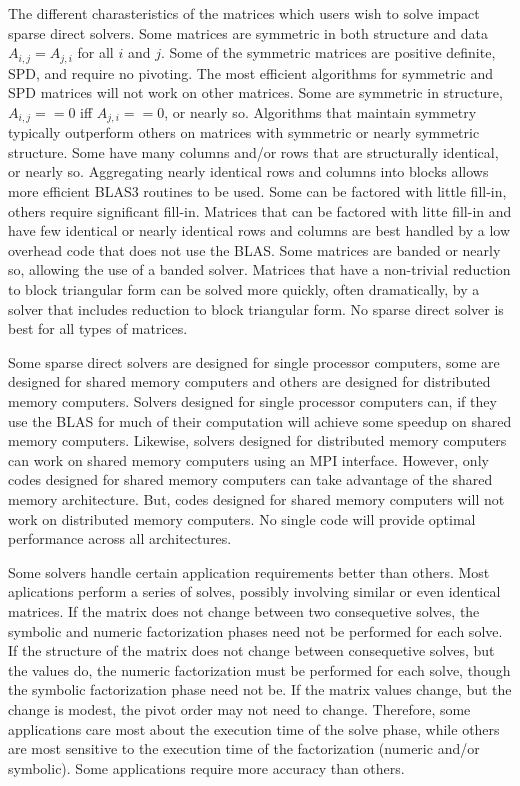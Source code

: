 \documentclass[acmtocl]{acmtrans2m}
\begin{document}
The different charasteristics of the matrices which users wish to
solve impact sparse direct solvers.  Some matrices are symmetric in both
structure and data $A_{i,j} = A_{j,i}$ for all $i$ and $j$.  Some of
the symmetric matrices are positive definite, SPD, and require no
pivoting.  The most efficient algorithms for symmetric and SPD
matrices will not work on other matrices.  Some are symmetric in
structure, $A_{i,j} == 0$ iff $A_{j,i} == 0$, or nearly so.
Algorithms that maintain symmetry typically outperform others on
matrices with symmetric or nearly symmetric structure.  Some have many
columns and/or rows that are structurally identical, or nearly so.
Aggregating nearly identical rows and columns into blocks allows more
efficient BLAS3 routines to be used.  Some can be factored with little
fill-in, others require significant fill-in.  Matrices that can be
factored with litte fill-in and have few identical or nearly identical
rows and columns are best handled by a low overhead code that does not
use the BLAS.  Some matrices are banded or nearly so, allowing the use
of a banded solver.  Matrices that have a non-trivial reduction to
block triangular form can be solved more quickly, often dramatically,
by a solver that includes reduction to block triangular form.  No sparse direct solver is best for all types of matrices.  

Some sparse direct solvers are designed for single processor
computers, some are designed for shared memory computers and others
are designed for distributed memory computers.  Solvers designed for
single processor computers can, if they use the BLAS for much of their
computation will achieve some speedup on shared memory computers.
Likewise, solvers designed for distributed memory computers can work
on shared memory computers using an MPI interface.  However, only
codes designed for shared memory computers can take advantage of the
shared memory architecture.  But, codes designed for shared memory
computers will not work on distributed memory computers.  No single
code will provide optimal performance across all architectures.

Some solvers handle certain application requirements better than
others.  Most aplications perform a series of solves, possibly
involving similar or even identical matrices.  If the matrix does not
change between two consequetive solves, the symbolic and numeric
factorization phases need not be performed for each solve.  If the
structure of the matrix does not change between consequetive solves,
but the values do, the numeric factorization must be performed for
each solve, though the symbolic factorization phase need not be.  If
the matrix values change, but the change is modest, the pivot order
may not need to change.  Therefore, some applications care most about
the execution time of the solve phase, while others are most sensitive
to the execution time of the factorization (numeric and/or symbolic).
Some applications require more accuracy than others.
\end{document}

